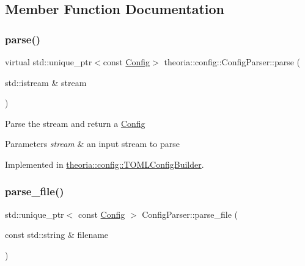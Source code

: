 \subsection{Member Function Documentation}
\mbox{\label{classtheoria_1_1config_1_1ConfigParser_af0ccd3cc2202c3d588a977c611dfa988}} 
\subsubsection{\texorpdfstring{parse()}{parse()}}
{\footnotesize\ttfamily virtual std\+::unique\+\_\+ptr$<$const \hyperlink{classtheoria_1_1config_1_1Config}{Config}$>$ theoria\+::config\+::\+Config\+Parser\+::parse (\begin{DoxyParamCaption}\item[{std\+::istream \&}]{stream }\end{DoxyParamCaption})\hspace{0.3cm}{\ttfamily [pure virtual]}}

Parse the stream and return a \hyperlink{classtheoria_1_1config_1_1Config}{Config} 
\begin{DoxyParams}{Parameters}
{\em stream} & an input stream to parse \\
\hline
\end{DoxyParams}


Implemented in \hyperlink{classtheoria_1_1config_1_1TOMLConfigBuilder_ac5a36aebe769d67decc9946ee2a3fbc3}{theoria\+::config\+::\+T\+O\+M\+L\+Config\+Builder}.

\mbox{\label{classtheoria_1_1config_1_1ConfigParser_a4eca80a9831324237f2a2aa9a5018c89}} 
\subsubsection{\texorpdfstring{parse\+\_\+file()}{parse\_file()}}
{\footnotesize\ttfamily std\+::unique\+\_\+ptr$<$ const \hyperlink{classtheoria_1_1config_1_1Config}{Config} $>$ Config\+Parser\+::parse\+\_\+file (\begin{DoxyParamCaption}\item[{const std\+::string \&}]{filename }\end{DoxyParamCaption})\hspace{0.3cm}{\ttfamily [virtual]}}

